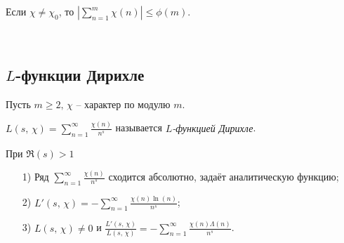 \begin{corollary} \label{l6_cor}
	Если $\chi \ne \chi_0$, то $\displaystyle \left| \sum\limits_{n=1}^m \chi(n) \right| \leq \phi(m)$.
\end{corollary}~\\

\subsection{$L$-функции Дирихле}
Пусть $m \geq 2, \, \chi$ -- характер по модулю $m$.
\begin{definition}
	$\displaystyle L(s, \, \chi) = \sum\limits_{n=1}^\infty \frac{\chi(n)}{n^s}$ называется \textit{$L$-функцией Дирихле}.
\end{definition}

\begin{lemma} \label{l6_lm4}
	При $\Re(s) > 1$
	\begin{enumerate}[nolistsep]
		\item[1)] Ряд $\displaystyle \sum\limits_{n=1}^\infty \frac{\chi(n)}{n^s}$ сходится абсолютно, задаёт аналитическую функцию;
		\item[2)] $\displaystyle L'(s, \, \chi) = -\sum\limits_{n=1}^\infty \frac{\chi(n)\ln(n)}{n^s}$;
		\item[3)] $\displaystyle L(s, \, \chi) \ne 0$ и $\frac{L'(s,\,\chi)}{L(s,\,\chi)} = -\sum\limits_{n=1}^\infty \frac{\chi(n)\Lambda(n)}{n^s}$.
	\end{enumerate}
\end{lemma}
